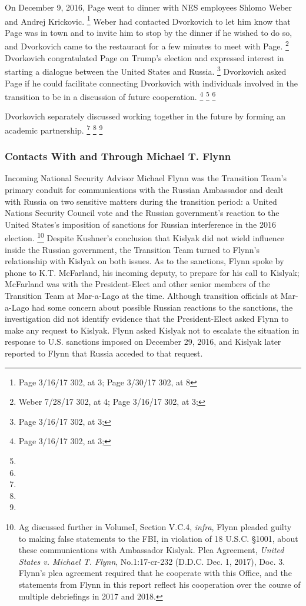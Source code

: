 On December 9, 2016, Page went to dinner with NES employees Shlomo Weber and Andrej Krickovic.%
\footnote{Page 3/16/17 302, at 3;
Page 3/30/17 302, at 8}
Weber had contacted Dvorkovich to let him know that Page was in town and to invite him to stop by the dinner if he wished to do so, and Dvorkovich came to the restaurant for a few minutes to meet with Page.%
\footnote{Weber 7/28/17 302, at 4;
Page 3/16/17 302, at 3;
}
Dvorkovich congratulated Page on Trump's election and expressed interest in starting a dialogue between the United States and Russia.%
\footnote{Page 3/16/17 302, at 3;
}
Dvorkovich asked Page if he could facilitate connecting Dvorkovich with individuals involved in the transition to be in a discussion of future cooperation.%
\footnote{Page 3/16/17 302, at 3;
}
\footnote{}
\footnote{}

Dvorkovich separately discussed working together in the future by forming an academic partnership.%
\footnote{}
\footnote{}
\footnote{}

\subsubsection{Contacts With and Through Michael T. Flynn}

Incoming National Security Advisor Michael Flynn was the Transition Team's primary conduit for communications with the Russian Ambassador and dealt with Russia on two sensitive matters during the transition period: a United Nations Security Council vote and the Russian government's reaction to the United States's imposition of sanctions for Russian interference in the 2016 election.%
\footnote{Ag discussed further in VolumeI, Section V.C.4, \textit{infra}, Flynn pleaded guilty to making false statements to the FBI, in violation of 18 U.S.C. \S 1001, about these communications with Ambassador Kislyak.
Plea Agreement, \textit{United States v. Michael T. Flynn}, No.1:17-cr-232 (D.D.C. Dec. 1, 2017), Doc. 3.
Flynn’s plea agreement required that he cooperate with this Office, and the statements from Flynn in this report reflect his cooperation over the course of multiple debriefings in 2017 and 2018.}
Despite Kushner's conclusion that Kislyak did not wield influence inside the Russian government, the Transition Team turned to Flynn's relationship with Kislyak on both issues.
As to the sanctions, Flynn spoke by phone to K.T. McFarland, his incoming deputy, to prepare for his call to Kislyak; McFarland was with the President-Elect and other senior members of the Transition Team at Mar-a-Lago at the time.
Although transition officials at Mar-a-Lago had some concern about possible Russian reactions to the sanctions, the investigation did not identify evidence that the President-Elect asked Flynn to make any request to Kislyak.
Flynn asked Kislyak not to escalate the situation in response to U.S. sanctions imposed on December 29, 2016, and Kislyak later reported to Flynn that Russia acceded to that request.

